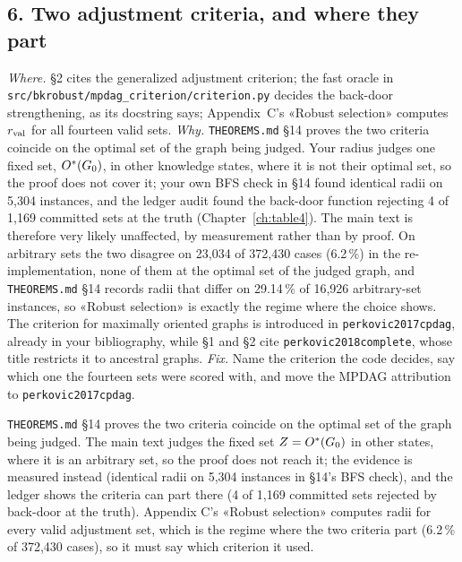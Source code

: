 \subsection*{6. Two adjustment criteria, and where they part}

\emph{Where.} \S2 cites the generalized adjustment criterion; the fast oracle in
\texttt{src/\allowbreak bkrobust/\allowbreak mpdag\_\allowbreak criterion/\allowbreak criterion.py} decides the back-door strengthening, as its docstring
says; Appendix~C's «Robust selection» computes $r_{\mathrm{val}}$ for all fourteen valid sets. \emph{Why.}
\texttt{THEOREMS.md} §14 proves the two criteria coincide on the optimal set of the graph being
judged. Your radius judges one fixed set, $O^{*}(G_0)$, in other knowledge states, where it is not
their optimal set, so the proof does not cover it; your own BFS check in §14 found identical radii on
5,304 instances, and the ledger audit found the back-door function rejecting 4 of 1,169 committed sets
at the truth (Chapter~\ref{ch:table4}). The main text is therefore very likely unaffected, by
measurement rather than by proof. On arbitrary sets the two disagree on 23,034 of 372,430 cases
(6.2\,\%) in the re-implementation, none of them at the optimal set of the judged graph, and \texttt{THEOREMS.md} §14 records radii that differ on 29.14\,\% of 16,926
arbitrary-set instances, so «Robust selection» is exactly the regime where the choice shows. The
criterion for maximally oriented graphs is introduced in \texttt{perkovic2017cpdag}, already in your
bibliography, while \S1 and \S2 cite \texttt{perkovic2018complete}, whose title restricts it to ancestral
graphs. \emph{Fix.} Name the criterion the code decides, say which one the fourteen sets were scored
with, and move the MPDAG attribution to \texttt{perkovic2017cpdag}.

%
{\texttt{THEOREMS.md} §14 proves the two criteria coincide on the optimal set of the graph being
judged. The main text judges the fixed set $Z = O^{*}(G_0)$ in other states, where it is an arbitrary
set, so the proof does not reach it; the evidence is measured instead (identical radii on 5,304
instances in §14's BFS check), and the ledger shows the criteria can part there (4 of 1,169 committed
sets rejected by back-door at the truth). Appendix C's «Robust selection» computes radii for every valid adjustment
set, which is the regime where the two criteria part (6.2\,\% of 372,430 cases), so it must say which
criterion it used.}


